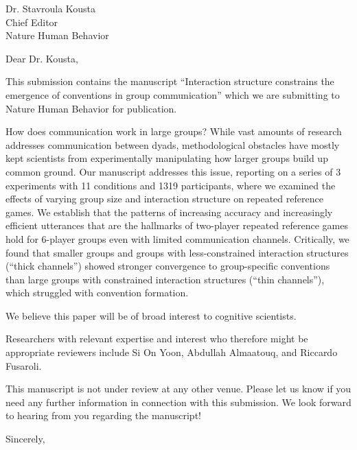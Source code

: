 \documentclass{stanfordletter}
\begin{document}
	\signature{Veronica Boyce \\ Robert D. Hawkins \\ Noah D. Goodman \\ Michael C. Frank}
	
	
	\begin{letter}{Dr. Stavroula Kousta \\ Chief Editor \\ Nature Human Behavior}
		
		
          \opening{Dear Dr. Kousta,} 
          This
          submission contains the manuscript ``Interaction structure constrains the emergence of conventions in group communication''
          which we are submitting to Nature Human Behavior for
          publication. 
          
          How does communication work in large groups? While vast amounts of research addresses communication between dyads, methodological obstacles have mostly kept scientists from experimentally manipulating how larger groups build up common ground. 
          Our manuscript addresses this issue, reporting on a series of 3 experiments with 11 conditions and 1319 participants, where we examined the effects of varying group size and interaction structure on repeated reference games. We establish that the patterns of increasing accuracy and increasingly efficient utterances that are the hallmarks of two-player repeated reference games hold for 6-player groups even with limited communication channels. Critically, we found that smaller groups and groups with less-constrained interaction structures (“thick channels”) showed stronger convergence to group-specific conventions than large groups with constrained interaction structures (“thin
          channels”), which struggled with convention formation.
          
          We believe this paper will be of broad
          interest to cognitive scientists.
		 
          Researchers with relevant expertise and interest who
          therefore might be appropriate reviewers include Si On Yoon, Abdullah Almaatouq, and 
		 Riccardo Fusaroli. 
		 
          This manuscript is not under review at any other
          venue. Please let us know if you need any further
          information in connection with this submission. We look
          forward to hearing from you regarding the manuscript!
          \closing{Sincerely,}
		
	\end{letter}
	
\end{document}
